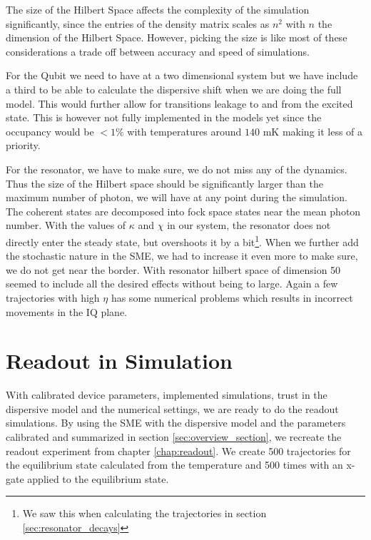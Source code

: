 The size of the Hilbert Space affects the complexity of the simulation significantly, since the entries of the density matrix scales as $n^2$ with $n$ the dimension of the Hilbert Space. However, picking the size is like most of these considerations a trade off between accuracy and speed of simulations. 

For the Qubit we need to have at a two dimensional system but we have include a third to be able to calculate the dispersive shift when we are doing the full model. This would further allow for transitions leakage to and from the excited state. This is however not fully implemented in the models yet since the occupancy would be $<1\%$ with temperatures around $140$ mK making it less of a priority.  

For the resonator, we have to make sure, we do not miss any of the dynamics. Thus the size of the Hilbert space should be significantly larger than the maximum number of photon, we will have at any point during the simulation. The coherent states are decomposed into fock space states near the mean photon number. With the values of $\kappa$ and $\chi$ in our system, the resonator does not directly enter the steady state, but overshoots it by a bit\footnote{We saw this when calculating the trajectories in section \ref{sec:resonator_decays}}. When we further add the stochastic nature in the SME, we had to increase it even more to make sure, we do not get near the border. With resonator hilbert space of dimension 50 seemed to include all the desired effects without being to large. Again a few trajectories with high $\eta$ has some numerical problems which results in incorrect movements in the IQ plane. 

\section{Readout in Simulation}
With calibrated device parameters, implemented simulations, trust in the dispersive model and the numerical settings, we are ready to do the readout simulations. By using the SME with the dispersive model and the parameters calibrated and summarized in section \ref{sec:overview_section}, we recreate the readout experiment from chapter \ref{chap:readout}. We create 500 trajectories for the equilibrium state calculated from the temperature and 500 times with an x-gate applied to the equilibrium state.

